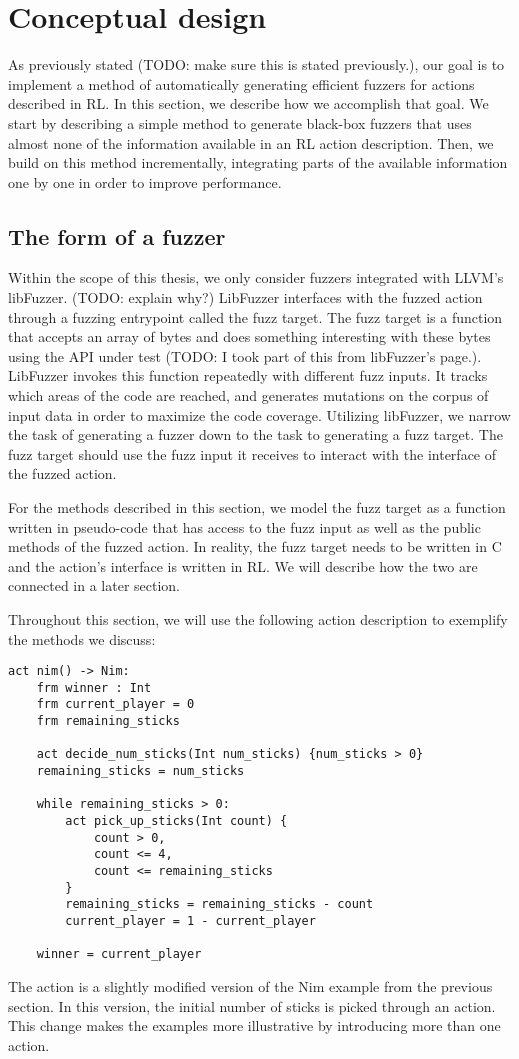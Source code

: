 \section{Conceptual design}
As previously stated (TODO: make sure this is stated previously.), our goal is to implement a method of automatically generating
 efficient fuzzers for actions described in RL.
In this section, we describe how we accomplish that goal.
We start by describing a simple method to generate black-box fuzzers that uses almost none of the information available in an RL action description.
Then, we build on this method incrementally, integrating parts of the available information one by one in order to improve performance.

\subsection{The form of a fuzzer}
Within the scope of this thesis, we only consider fuzzers integrated with LLVM's libFuzzer. (TODO: explain why?)
LibFuzzer interfaces with the fuzzed action through a fuzzing entrypoint called the fuzz target.
The fuzz target is a function that accepts an array of bytes and does something interesting with these bytes using the API under test (TODO: I took part of this from libFuzzer's page.).
LibFuzzer invokes this function repeatedly with different fuzz inputs. It tracks which areas of the code are reached, and generates mutations on the corpus of input data in order to maximize the code coverage.
Utilizing libFuzzer, we narrow the task of generating a fuzzer down to the task to generating a fuzz target.
The fuzz target should use the fuzz input it receives to interact with the interface of the fuzzed action.

For the methods described in this section, we model the fuzz target as a function written in pseudo-code that has access to the fuzz input as well
 as the public methods of the fuzzed action.
In reality, the fuzz target needs to be written in C and the action's interface is written in RL. We will describe how the two are connected in a later section.

Throughout this section, we will use the following action description to exemplify the methods we discuss:
\begin{lstlisting}
act nim() -> Nim:
    frm winner : Int
    frm current_player = 0
    frm remaining_sticks

    act decide_num_sticks(Int num_sticks) {num_sticks > 0}
    remaining_sticks = num_sticks

    while remaining_sticks > 0:
        act pick_up_sticks(Int count) {
            count > 0,
            count <= 4,
            count <= remaining_sticks
        }
        remaining_sticks = remaining_sticks - count
        current_player = 1 - current_player

    winner = current_player
\end{lstlisting}
The action is a slightly modified version of the Nim example from the previous section.
In this version, the initial number of sticks is picked through an action. This change makes the examples more illustrative by introducing more than one action.

